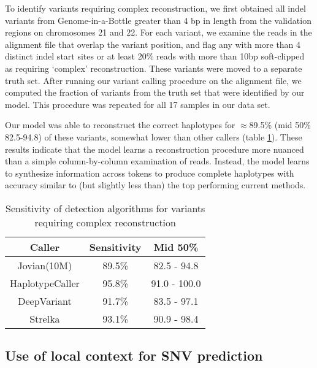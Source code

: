 \documentclass[]{article}
\begin{document}
To identify variants requiring complex reconstruction, we first obtained all indel variants from Genome-in-a-Bottle greater than 4 bp in length from the validation regions on chromosomes 21 and 22. For each variant, we examine the reads in the alignment file that overlap the variant position, and flag any with more than 4 distinct indel start sites or at least 20\% reads with more than 10bp soft-clipped as requiring `complex' reconstruction. These variants were moved to a separate truth set. After running our variant calling procedure on the alignment file, we computed the fraction of variants from the truth set that were identified by our model. This procedure was repeated for all 17 samples in our data set. 

Our model was able to reconstruct the correct haplotypes for $\approx$89.5\% (mid 50\% 82.5-94.8) of these variants, somewhat lower than other callers (table \ref{table:complex-sensitivity}).  These results indicate that the model learns a reconstruction procedure more nuanced than a simple column-by-column examination of reads. Instead, the model learns to synthesize information across tokens to produce complete haplotypes with accuracy similar to (but slightly less than) the top performing current methods. 

\begin{center}
\begin{table}	 
	\begin{tabular}{ ccc }
	 Caller & Sensitivity & Mid 50\%  \\ 
	\hline
	 Jovian(10M) & 89.5\% & 82.5 - 94.8 \\ 
	 HaplotypeCaller & 95.8\% & 91.0 - 100.0  \\ 
	 DeepVariant & 91.7\% & 83.5 - 97.1  \\ 
	 Strelka & 93.1\% & 90.9 - 98.4 \\
	 \hline

	\end{tabular}
	\label{table:complex-sensitivity}
	\caption{ Sensitivity of detection algorithms for variants requiring complex reconstruction }
\end{table}
\end{center}


\subsection{Use of local context for SNV prediction}
 
\end{document}
